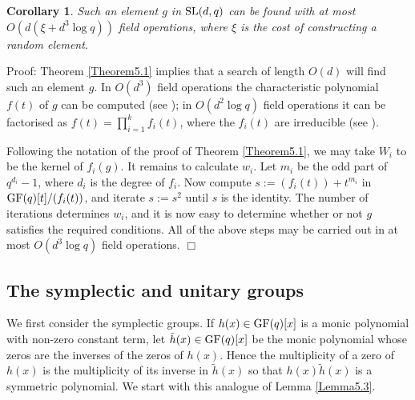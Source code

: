 \documentclass[12pt]{article}
\newtheorem{corollary}[definition]{Corollary}
\newenvironment{proof}{\normalsize {\sc Proof}:}{{\hfill $\Box$ \\}}
\def\SL{{\rm SL}}
\def\GF{{\rm GF}}
\begin{document}
\begin{corollary}\label{Corollary5.1} Such an element $g$ in $\SL(d,q)$ 
can be found with at most $O(d(\xi + d^3\log q))$ field operations,
where $\xi$ is the cost of constructing a random element.
\end{corollary}
\begin{proof}
Theorem \ref{Theorem5.1} implies that a search of length $O(d)$ 
will find such an element $g$. 
In $O(d^3)$ field operations 
the characteristic polynomial $f(t)$ of $g$ can be
computed (see \cite[Section 7.2]{HoltEickOBrien05}); 
in $O(d^2 \log q)$ field operations it can be factorised as 
$f(t)=\prod_{i=1}^kf_i(t)$, where the $f_i(t)$ are irreducible 
(see \cite[Theorem 14.14]{vzg}).

Following the notation of the proof of Theorem \ref{Theorem5.1},  
we may take $W_i$ to be the
kernel of $f_i(g)$. It remains to calculate $w_i$. Let $m_i$ be the
odd part of $q^{d_i}-1$, where $d_i$ is the degree of $f_i$. Now
compute $s :=(f_i(t))+t^{m_i}$ in $\GF(q)[t]/(f_i(t))$, and iterate 
$s := s^2$  until $s$ is the identity. The number of iterations
determines $w_i$, and it is now easy to determine whether or not $g$
satisfies the required conditions. All of the above steps may be carried
out in at most $O(d^3 \log q)$ field operations. 
\end{proof}


\subsection{The symplectic and unitary groups}
We first consider the symplectic groups.
If $h(x)\in\GF(q)[x]$ is a
monic polynomial with non-zero constant term, let
$\tilde{h}(x)\in\GF(q)[x]$ be the monic polynomial  whose zeros are the
inverses of the zeros of $h(x)$. Hence the multiplicity of a zero of
$h(x)$ is the multiplicity of its inverse in $\tilde{h}(x)$ so that
$h(x)\tilde{h}(x)$ is a symmetric  polynomial.  We start with this
analogue of Lemma \ref{Lemma5.3}.
\end{document}
